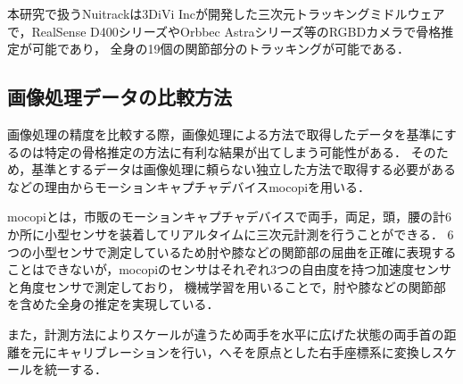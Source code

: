 \documentclass[titlepage]{jarticle}
\begin{document}



本研究で扱うNuitrackは3DiVi Incが開発した三次元トラッキングミドルウェアで，RealSense D400シリーズやOrbbec Astraシリーズ等のRGBDカメラで骨格推定が可能であり，
全身の19個の関節部分のトラッキングが可能である．
%
%
%

%
%
\subsection{画像処理データの比較方法}
%
画像処理の精度を比較する際，画像処理による方法で取得したデータを基準にするのは特定の骨格推定の方法に有利な結果が出てしまう可能性がある．
そのため，基準とするデータは画像処理に頼らない独立した方法で取得する必要があるなどの理由からモーションキャプチャデバイスmocopi\cite{mocopi}を用いる．

mocopiとは，市販のモーションキャプチャデバイスで両手，両足，頭，腰の計6か所に小型センサを装着してリアルタイムに三次元計測を行うことができる．
6つの小型センサで測定しているため肘や膝などの関節部の屈曲を正確に表現することはできないが，mocopiのセンサはそれぞれ3つの自由度を持つ加速度センサと角度センサで測定しており，
機械学習を用いることで，肘や膝などの関節部を含めた全身の推定を実現している．

また，計測方法によりスケールが違うため両手を水平に広げた状態の両手首の距離を元にキャリブレーションを行い，へそを原点とした右手座標系に変換しスケールを統一する．%
\end{document}
